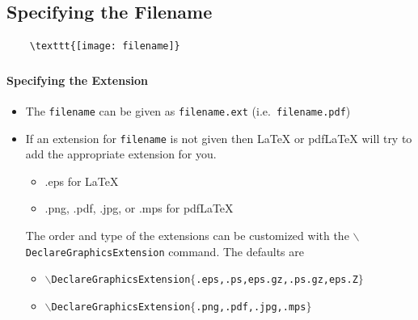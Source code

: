 \documentclass[article]{beamer}
\begin{document}
\subsection{Specifying the Filename}
\begin{frame}
  \begin{verbatim}
    \texttt{[image: filename]}
  \end{verbatim} \vspace{-16pt}
  \frametitle{\thesection}
  \framesubtitle{Specifying the Extension}
  \begin{itemize}%
    \item The \texttt{filename} can be given as \texttt{filename.ext} (i.e.\ \texttt{filename.pdf})
    \item If an extension for \texttt{filename} is not given then \LaTeX{} or pdf\LaTeX{} will try to add the appropriate extension for you.
          \begin{itemize}%
            \item .eps for \LaTeX{}
            \item .png, .pdf, .jpg, or .mps for pdf\LaTeX{}
          \end{itemize}
          The order and type of the extensions can be customized with the \texttt{\(\backslash\)DeclareGraphicsExtension} command.  The defaults are 
          \begin{itemize}%
              \footnotesize
            \item \texttt{\(\backslash\)DeclareGraphicsExtension$\{$.eps,.ps,eps.gz,.ps.gz,eps.Z$\}$}
            \item
              \texttt{\(\backslash\)DeclareGraphicsExtension$\{$.png,.pdf,.jpg,.mps$\}$}
          \end{itemize}
          
  \end{itemize}
\end{frame}
\end{document}
